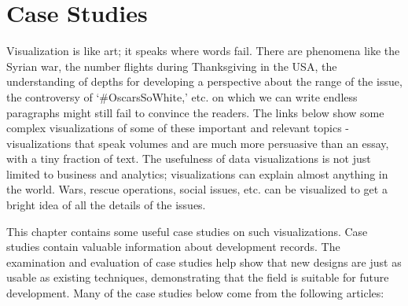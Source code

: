 \documentclass[]{book}
\theoremstyle{definition}
\theoremstyle{definition}
\theoremstyle{definition}
\theoremstyle{remark}
\begin{document}
\chapter{Case Studies}\label{case-studies}

Visualization is like art; it speaks where words fail. There are
phenomena like the Syrian war, the number flights during Thanksgiving in
the USA, the understanding of depths for developing a perspective about
the range of the issue, the controversy of `\#OscarsSoWhite,' etc. on
which we can write endless paragraphs might still fail to convince the
readers. The links below show some complex visualizations of some of
these important and relevant topics - visualizations that speak volumes
and are much more persuasive than an essay, with a tiny fraction of
text. The usefulness of data visualizations is not just limited to
business and analytics; visualizations can explain almost anything in
the world. Wars, rescue operations, social issues, etc. can be
visualized to get a bright idea of all the details of the issues.

This chapter contains some useful case studies on such visualizations.
Case studies contain valuable information about development records. The
examination and evaluation of case studies help show that new designs
are just as usable as existing techniques, demonstrating that the field
is suitable for future development. Many of the case studies below come
from the following articles:
\end{document}

